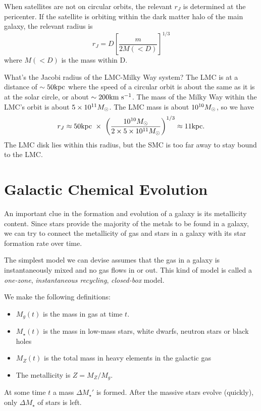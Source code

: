 \documentclass[]{article}
\begin{document}
When satellites are not on circular orbits, the relevant $r_J$ is determined at the pericenter. If the
satellite is orbiting within the dark matter halo of the main galaxy, the relevant radius is
\begin{equation}
r_J = D\left[\frac{m}{2M(<D)}\right]^{1/3}
\end{equation}
where $M(<D)$ is the mass within D.

What's the Jacobi radius of the LMC-Milky Way system? The LMC is at a distance of $\sim50\mathrm{kpc}$ where
the speed of a circular orbit is about the same as it is at the solar circle, or about $\sim200\mathrm{km}~\mathrm{s}^{-1}$.
The mass of the Milky Way within the LMC's orbit is about $5\times10^{11}M_{\odot}$.  The LMC mass is about
$10^{10}M_{\odot}$, so we have
\begin{equation}
r_J\approx 50\mathrm{kpc}~\times~\left(\frac{10^{10}M_{\odot}}{2\times5\times10^{11}M_{\odot}}\right)^{1/3} \approx 11\mathrm{kpc}.
\end{equation}
The LMC disk lies within this radius, but the SMC is too far away to stay bound to the LMC.

\section{Galactic Chemical Evolution}

An important clue in the formation and evolution of a galaxy is its metallicity content.
Since stars provide the majority of the metals to be found in a galaxy, we can try to connect the
metallicity of gas and stars in a galaxy with its star formation rate over time.

The simplest model we can devise assumes that the gas in a galaxy is instantaneously 
mixed and no gas flows in or out.  This kind of model is called a {\it one-zone},
{\it instantaneous recycling}, {\it closed-box} model.

We make the following definitions:

\begin{itemize}
\item $M_g(t)$ is the mass in gas at time $t$.
\item $M_\star(t)$ is the mass in low-mass stars, white dwarfs, neutron
stars or black holes
\item $M_Z(t)$ is the total mass in heavy elements in the galactic gas
\item The metallicity is $Z = M_Z/M_g$.
\end{itemize}

At some time $t$ a mass $\Delta M_\star'$ is formed. After the massive
stars evolve (quickly), only $\Delta M_\star$ of stars is left.
\end{document}
